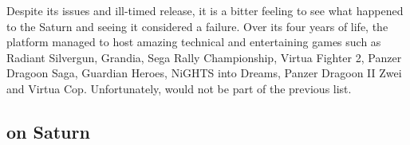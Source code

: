 Despite its issues and ill-timed release, it is a bitter feeling to see what happened to the Saturn and seeing it considered a failure. Over its four years of life, the platform managed to host amazing technical and entertaining games such as Radiant Silvergun, Grandia, Sega Rally Championship, Virtua Fighter 2, Panzer Dragoon Saga, Guardian Heroes, NiGHTS into Dreams, Panzer Dragoon II Zwei and Virtua Cop. Unfortunately, \doom{} would not be part of the previous list.\\
\par
{}




























\subsection{\doom{} on Saturn}

